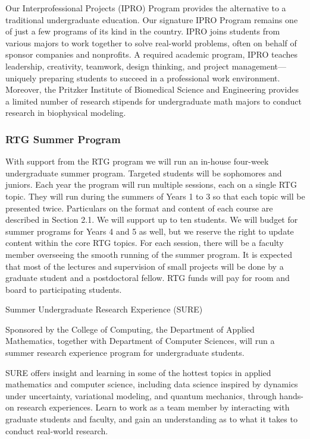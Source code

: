 \documentclass[11pt]{article}
\begin{document}
Our Interprofessional Projects (IPRO) Program provides the alternative to a traditional undergraduate education. Our signature IPRO Program remains one of just a few programs of its kind in the country. IPRO joins students from various majors to work together to solve real-world problems, often on behalf of sponsor companies and nonprofits. A required academic program, IPRO teaches leadership, creativity, teamwork, design thinking, and project management—uniquely preparing students to succeed in a professional work environment. Moreover, the  Pritzker Institute of Biomedical Science and Engineering provides a limited number of research stipends for undergraduate math majors to conduct research in biophysical modeling. 


\subsubsection*{RTG Summer Program}
With support from the RTG program we will run an in-house four-week undergraduate summer program.
Targeted students will be sophomores and juniors. Each year the program will run multiple sessions, each on a single RTG topic. They will run during the summers of Years 1 to 3 so that each topic
will be presented twice. Particulars on the format and content of each course are described in Section 2.1.
We will support up to ten students. We will budget for summer programs for Years 4 and 5 as well, but we reserve
the right to update content within the core RTG topics. For each session, there will be a faculty member
  overseeing the smooth running of the summer program. It is expected that most of the lectures
and supervision of small projects will be done by a graduate student and a postdoctoral fellow. RTG funds
will pay for room and board to participating students.

\medskip

 Summer Undergraduate Research Experience (SURE)

Sponsored by the College of Computing, the Department of Applied
Mathematics, together with Department of Computer Sciences, will run a
summer research experience program for undergraduate students.

SURE offers insight and learning in some of the hottest topics in
applied mathematics and computer science, including data science inspired by dynamics under uncertainty, variational modeling, and quantum mechanics,   through hands-on research
experiences. Learn to work as a team member by interacting with graduate
students and faculty, and gain an understanding as to what it takes to
conduct real-world research.
\end{document}
